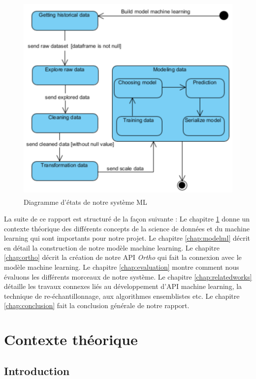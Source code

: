\documentclass[12pt, french]{report}
\begin{document}
\begin{figure}[h]
	\includegraphics[width=11.53cm, height =10.42cm]{images/sdml.png}
	\caption{Diagramme d'états de notre système ML}
	\label{sdml}
\end{figure} 

La suite de ce rapport est structuré de la façon suivante : Le chapitre \ref{chap:background} donne un contexte théorique des différents concepts de la science de données et du machine learning qui sont importants pour notre projet. Le chapitre \ref{chap:modelml} décrit en détail la construction de notre modèle machine learning. Le chapitre \ref{chap:ortho} décrit la création de notre API \textit{Ortho} qui fait la connexion avec le modèle machine learning. Le chapitre \ref{chap:evaluation} montre comment nous évaluons les différents morceaux de notre système. Le chapitre \ref{chap:relatedworks} détaille les travaux connexes liés au développement d'API machine learning, la technique de re-échantillonnage, aux algorithmes ensemblistes etc. Le chapitre \ref{chap:conclusion} fait la conclusion générale de notre rapport.


\newpage

\chapter{Contexte théorique} \label{chap:background}
\section{Introduction}
\end{document}
